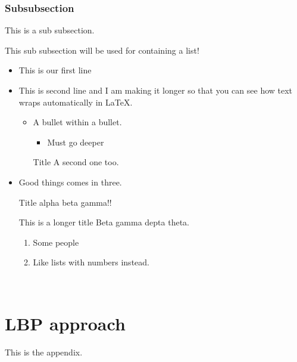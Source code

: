 \documentclass{article}
\begin{document}

\subsubsection{Subsubsection}\cite{ref:Spoof_two}
This is a sub subsection.

This sub subsection will be used for containing a list!

\begin{itemize}
	\item This is our first line
	\item This is second line and I am making it longer so that you can see how text wraps automatically in LaTeX.
	\begin{itemize}
		\item A bullet within a bullet.
			\begin{itemize}
				\item Must go deeper
			\end{itemize}
		\item[Title] A second one too. %
 	\end{itemize}
	\item Good things comes in three.
	\item [Title] alpha beta gamma!!
	\item[This is a longer title] Beta gamma depta theta. 
		\begin{enumerate} %
			\item Some people
			\item Like lists with numbers instead.
		\end{enumerate}
\end{itemize}


\cleardoublepage

\cleardoublepage\

\appendix
\section{LBP approach}
This is the appendix.
\end{document}
